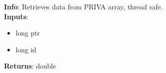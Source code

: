 \textbf{Info}: Retrieves data from PRIVA array, thread safe. \\

\noindent \textbf{Inputs}:
\begin{itemize}
\item{long ptr}
\item{long id}
\end{itemize}

\noindent \textbf{Returns}: double
